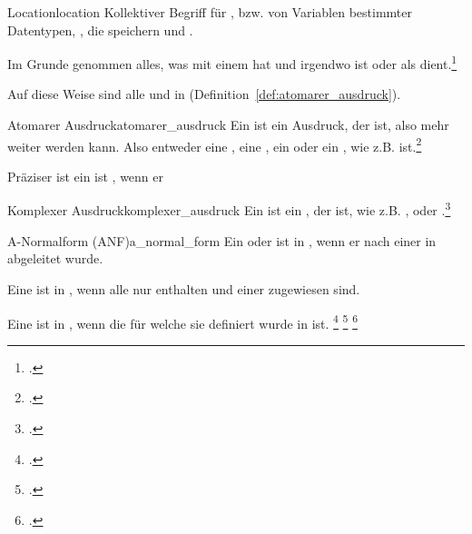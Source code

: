 \begin{Definition}{Location}{location}
  Kollektiver Begriff für ,  bzw.  von Variablen bestimmter Datentypen, , die  speichern und .

  Im Grunde genommen alles, was mit einem  hat und irgendwo  ist oder als  dient.\footcite{g_siek_course_2022}
\end{Definition}

Auf diese Weise sind alle  und  in  (Definition~\ref{def:atomarer_ausdruck}).


\begin{Definition}{Atomarer Ausdruck}{atomarer_ausdruck}
  Ein  ist ein Ausdruck, der  ist, also  mehr weiter  werden kann. Also entweder eine  , eine  , ein   oder ein , wie z.B.  ist.\footcite{g_siek_course_2022}

  Präziser ist ein  ist , wenn er
\end{Definition}

\begin{Definition}{Komplexer Ausdruck}{komplexer_ausdruck}
  Ein  ist ein , der  ist, wie z.B. ,  oder .\footcite{g_siek_course_2022}
\end{Definition}

\begin{Definition}{A-Normalform (ANF)}{a_normal_form}
  Ein  oder  ist in , wenn er nach einer  in  abgeleitet wurde.

  Eine  ist in , wenn alle  nur  enthalten und einer  zugewiesen sind.

  Eine  ist in , wenn die  für welche sie definiert wurde in  ist.
  \footcite{noauthor_-normalization_nodate}
  \footcite{bolingbroke_types_2009}
  \footcite{g_siek_course_2022}
\end{Definition}

